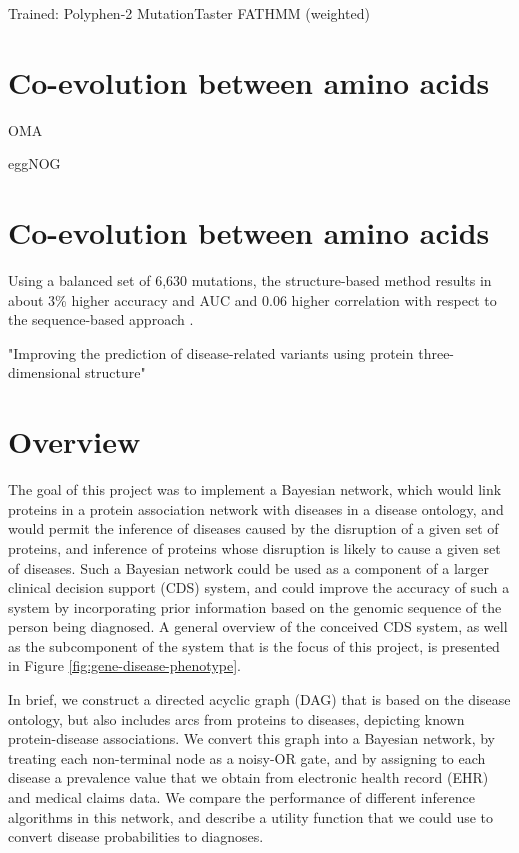 \documentclass[11pt]{article}
\begin{document}
Trained:
Polyphen-2
MutationTaster
FATHMM (weighted)



\section{Co-evolution between amino acids}


OMA

eggNOG





\section{Co-evolution between amino acids}

Using a balanced set of 6,630 mutations, the structure-based method results in about 3\% higher accuracy and AUC and 0.06 higher correlation with respect to the sequence-based approach \cite{Capriotti2011}.

"Improving the prediction of disease-related variants using protein three-dimensional structure"


















\section*{Overview}

The goal of this project was to implement a Bayesian network, which would link proteins in a protein association network with diseases in a disease ontology, and would permit the inference of diseases caused by the disruption of a given set of proteins, and inference of proteins whose disruption is likely to cause a given set of diseases. Such a Bayesian network could be used as a component of a larger clinical decision support (CDS) system, and could improve the accuracy of such a system by incorporating prior information based on the genomic sequence of the person being diagnosed. A general overview of the conceived CDS system, as well as the subcomponent of the system that is the focus of this project, is presented in Figure \ref{fig:gene-disease-phenotype}. 

In brief, we construct a directed acyclic graph (DAG) that is based on the disease ontology, but also includes arcs from proteins to diseases, depicting known protein-disease associations. We convert this graph into a Bayesian network, by treating each non-terminal node as a noisy-OR gate, and by assigning to each disease a prevalence value that we obtain from electronic health record (EHR) and medical claims data. We compare the performance of different inference algorithms in this network, and describe a utility function that we could use to convert disease probabilities to diagnoses. 
\end{document}
